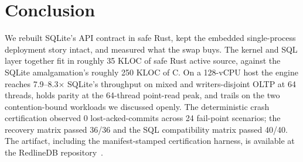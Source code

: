 \section{Conclusion}\label{sec:conclusion}

We rebuilt SQLite's API contract in safe Rust, kept the embedded
single-process deployment story intact, and measured what the swap
buys. The kernel and SQL layer together fit in roughly 35 KLOC of
safe Rust active source, against the SQLite amalgamation's roughly
250 KLOC of C. On a 128-vCPU host the engine reaches 7.9--8.3$\times$
SQLite's throughput on mixed and writers-disjoint OLTP at 64 threads,
holds parity at the 64-thread point-read peak, and trails on the two
contention-bound workloads we discussed openly. The deterministic
crash certification observed 0 lost-acked-commits across 24
fail-point scenarios; the recovery matrix passed 36/36 and the SQL
compatibility matrix passed 40/40. The artifact, including the
manifest-stamped certification harness, is available at the
RedlineDB repository~\cite{redlinedb}.
